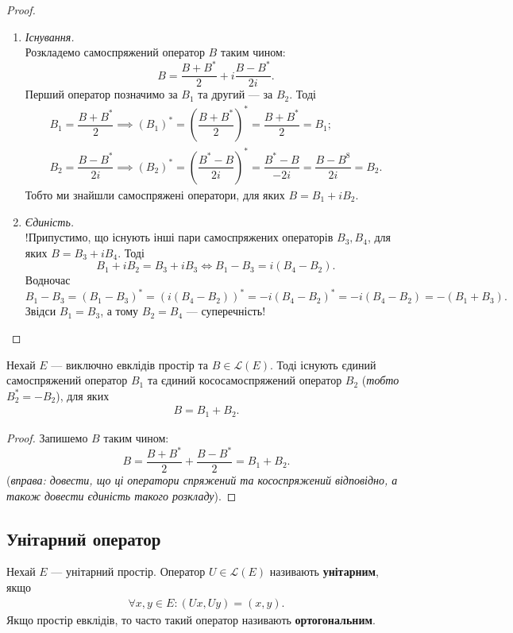 \documentclass{math_library}
\begin{document}
\begin{proof}
\begin{enumerate}[topsep=0pt,wide=0pt,label={\Roman*.}]
\item \textit{Існування.}\\
Розкладемо самоспряжений оператор $B$ таким чином:
\[
B = \dfrac{B+B^*}{2}+ i \dfrac{B-B^*}{2i}.
\]
Перший оператор позначимо за $B_1$ та другий --- за $B_2$. Тоді
\begin{align*}
B_1 = \dfrac{B+B^*}{2} \implies (B_1)^* = \left( \dfrac{B+B^*}{2} \right)^* = \dfrac{B+B^*}{2} = B_1; \\
B_2 = \dfrac{B-B^*}{2i} \implies (B_2)^* = \left( \dfrac{B^*-B}{2i} \right)^* = \dfrac{B^*-B}{-2i} = \dfrac{B-B^8}{2i} = B_2.
\end{align*}
Тобто ми знайшли самоспряжені оператори, для яких $B = B_1 + iB_2$.

\item \textit{Єдиність.}\\
!Припустимо, що існують інші пари самоспряжених операторів $B_3, B_4$, для яких $B = B_3 + i B_4$. Тоді 
\[
B_1 + iB_2 = B_3 + iB_3 \iff B_1-B_3 = i(B_4-B_2).
\]
Водночас
\[
B_1-B_3=(B_1-B_3)^* = (i(B_4-B_2))^* = -i(B_4-B_2)^* = -i(B_4-B_2) = -(B_1+B_3).
\]
Звідси $B_1 = B_3$, а тому $B_2 = B_4$ --- суперечність! \qedhere
\end{enumerate}
\end{proof}

\begin{proposition}
Нехай $E$ --- виключно евклідів простір та $B \in \mathcal{L}(E)$. Тоді існують єдиний самоспряжений оператор $B_1$ та єдиний кососамоспряжений оператор $B_2$ (\textit{тобто $B_2^* = -B_2$}), для яких
\begin{align*}
B = B_1 + B_2.
\end{align*}
\end{proposition}

\begin{proof}
Запишемо $B$ таким чином:
\[
B = \dfrac{B+B^*}{2} + \dfrac{B-B^*}{2} = B_1 + B_2.
\]
(\textit{вправа: довести, що ці оператори спряжений та кососпряжений відповідно, а також довести єдиність такого розкладу}).
\end{proof}

\subsection{Унітарний оператор}
\begin{definition}
Нехай $E$ --- унітарний простір. Оператор $U \in \mathcal{L}(E)$ називають \textbf{унітарним}, якщо
\begin{align*}
\forall x,y \in E: (Ux,Uy) = (x,y).
\end{align*}
Якщо простір евклідів, то часто такий оператор називають \textbf{ортогональним}.
\end{definition}
\end{document}
